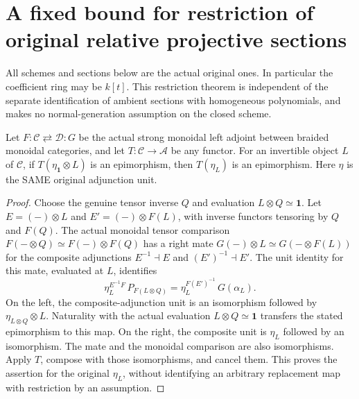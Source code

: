 \section{A fixed bound for restriction of original relative projective sections}
\label{sec:c0n-section-lift}

All schemes and sections below are the actual original ones. In particular
the coefficient ring may be $k[t]$. This restriction theorem is independent
of the separate identification of ambient sections with homogeneous
polynomials, and makes no normal-generation assumption on the closed scheme.

\begin{lemma}
\label{lem:c0n-line-unit-section-transport}
\leanok
{}
Let $F:\mathcal C\rightleftarrows\mathcal D:G$ be the actual strong monoidal
left adjoint between braided monoidal categories, and let
$T:\mathcal C\to\mathcal A$ be any functor. For an invertible
object $L$ of $\mathcal C$, if $T(\eta_{\mathbf1}\otimes L)$ is an
epimorphism, then $T(\eta_L)$ is an epimorphism. Here $\eta$ is the SAME
original adjunction unit.
\end{lemma}
\begin{proof}
Choose the genuine tensor inverse $Q$ and evaluation $L\otimes Q\simeq
\mathbf1$. Let $E=(-)\otimes L$ and $E'=(-)\otimes F(L)$, with inverse
functors tensoring by $Q$ and $F(Q)$. The actual monoidal tensor comparison
$F(-\otimes Q)\simeq F(-)\otimes F(Q)$ has a right mate
$G(-)\otimes L\simeq G(-\otimes F(L))$ for the composite adjunctions
$E^{-1}\dashv E$ and $(E')^{-1}\dashv E'$. The unit identity for this
mate, evaluated at $L$, identifies
\[
 \eta^{E^{-1}F}_L\,P_{F(L\otimes Q)}
 =\eta^{F(E')^{-1}}_L\,G(\alpha_L).
\]
On the left, the composite-adjunction unit is an isomorphism followed by
$\eta_{L\otimes Q}\otimes L$. Naturality with the actual evaluation
$L\otimes Q\simeq\mathbf1$ transfers the stated epimorphism to this map.
On the right, the composite unit is $\eta_L$ followed by an isomorphism.
The mate and the monoidal comparison are also isomorphisms. Apply $T$,
compose with those isomorphisms, and cancel them. This proves the assertion
for the original $\eta_L$, without identifying an arbitrary replacement map
with restriction by an assumption.
\end{proof}

